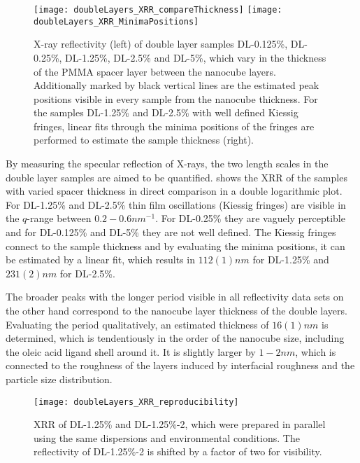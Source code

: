 \documentclass[\main/dresen_thesis.tex]{subfiles}
\begin{document}
  \label{sec:doublelayers:layers:pnr}
  \begin{figure}[tb]
    \centering
    \texttt{[image: doubleLayers\_XRR\_compareThickness]}
    \texttt{[image: doubleLayers\_XRR\_MinimaPositions]}
    \caption{\label{fig:doublelayers:xrr:thicknessComparison}X-ray reflectivity (left) of double layer samples DL-0.125\%, DL-0.25\%, DL-1.25\%, DL-2.5\% and DL-5\%, which vary in the thickness of the PMMA spacer layer between the nanocube layers. Additionally marked by black vertical lines are the estimated peak positions visible in every sample from the nanocube thickness. For the samples DL-1.25\% and DL-2.5\% with well defined Kiessig fringes, linear fits through the minima positions of the fringes are performed to estimate the sample thickness (right).}
  \end{figure}
  By measuring the specular reflection of X-rays, the two length scales in the double layer samples are aimed to be quantified.
   shows the XRR of the samples with varied spacer thickness in direct comparison in a double logarithmic plot.
  For DL-1.25\% and DL-2.5\% thin film oscillations (Kiessig fringes) are visible in the $q$-range between $0.2 - 0.6 \unit{nm^{-1}}$.
  For DL-0.25\% they are vaguely perceptible and for DL-0.125\% and DL-5\% they are not well defined.
  The Kiessig fringes connect to the sample thickness and by evaluating the minima positions, it can be estimated by a linear fit, which results in $112(1) \unit{nm}$ for DL-1.25\% and $231(2) \unit{nm}$ for DL-2.5\%.

  The broader peaks with the longer period visible in all reflectivity data sets on the other hand correspond to the nanocube layer thickness of the double layers.
  Evaluating the period qualitatively, an estimated thickness of $16(1) \unit{nm}$ is determined, which is tendentiously in the order of the nanocube size, including the oleic acid ligand shell around it.
  It is slightly larger by $1 - 2 \unit{nm}$, which is connected to the roughness of the layers induced by interfacial roughness and the particle size distribution.

  \begin{figure}[tb]
    \centering
    \texttt{[image: doubleLayers\_XRR\_reproducibility]}
    \caption{\label{fig:doublelayers:xrr:reproducibility}XRR of DL-1.25\% and DL-1.25\%-2, which were prepared in parallel using the same dispersions and environmental conditions. The reflectivity of DL-1.25\%-2 is shifted by a factor of two for visibility.}
  \end{figure}
\end{document}
